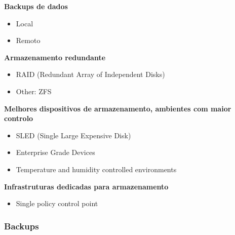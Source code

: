 \documentclass{article}
\begin{document}
\begin{flushleft}
  \textbf{Backups de dados}
  \begin{itemize}
    \item Local
    \item Remoto
  \end{itemize}

  \textbf{Armazenamento redundante}
  \begin{itemize}
    \item RAID (Redundant Array of Independent Disks)
    \item Other: ZFS
  \end{itemize}

  \textbf{Melhores dispositivos de armazenamento, ambientes com maior controlo}
  \begin{itemize}
    \item SLED (Single Large Expensive Disk)
    \item Enterprise Grade Devices
    \item Temperature and humidity controlled environments
  \end{itemize}

  \textbf{Infrastruturas dedicadas para armazenamento}
  \begin{itemize}
    \item Single policy control point
  \end{itemize}
\end{flushleft}

\pagebreak

\subsubsection{Backups}
\end{document}
